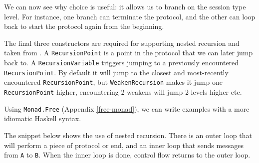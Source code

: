 \documentclass[runningheads,plain]{llncs}
\newenvironment{Shaded}{}{}
\newcommand{\KeywordTok}[1]{\textcolor[rgb]{0.00,0.44,0.13}{\textbf{#1}}}
\newcommand{\DataTypeTok}[1]{\textcolor[rgb]{0.56,0.13,0.00}{#1}}
\newcommand{\StringTok}[1]{\textcolor[rgb]{0.25,0.44,0.63}{#1}}
\newcommand{\CommentTok}[1]{\textcolor[rgb]{0.38,0.63,0.69}{\textit{#1}}}
\newcommand{\FunctionTok}[1]{\textcolor[rgb]{0.02,0.16,0.49}{#1}}
\newcommand{\NormalTok}[1]{#1}
\begin{document}
We can now see why choice is useful: it allows us to branch on the
session type level. For instance, one branch can terminate the protocol,
and the other can loop back to start the protocol again from the beginning.

The final three constructors are required for supporting nested
recursion and taken from \cite{van2017session}. A
\texttt{RecursionPoint} is a point in the protocol that we can later
jump back to. A \texttt{RecursionVariable} triggers jumping to a
previously encountered \texttt{RecursionPoint}. By default it will jump
to the closest and most-recently encountered \texttt{RecursionPoint},
but \texttt{WeakenRecursion} makes it jump one \texttt{RecursionPoint}
higher, encountering 2 weakens will jump 2 levels higher etc.

Using \texttt{Monad.Free} (Appendix \ref{free-monad}), we can write
examples with a more idiomatic Haskell syntax.

The snippet below shows the use of nested recursion. There is an outer
loop that will perform a piece of protocol or end, and an inner loop
that sends messages from \texttt{A} to \texttt{B}. When the inner loop
is done, control flow returns to the outer loop.

\begin{Shaded}
\end{Shaded}
\end{document}
